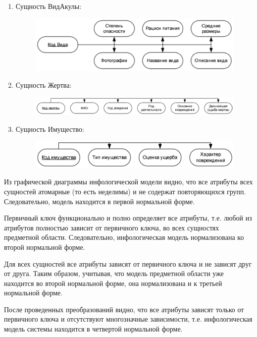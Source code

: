 \documentclass[russian,utf8,simple,emptystyle]{eskdtext}
\begin{document}
\begin{enumerate}
\begin{enumerate}
		\item Сущность ВидАкулы:
		\begin{figure}[h!]
		\centering
		\includegraphics*[width=\textwidth]{inf6}
		\end{figure}
		
		\item Сущность Жертва:
		\begin{figure}[h!]
		\centering
		\includegraphics*[width=\textwidth]{inf7}
		\end{figure}	
		\clearpage
		
		\item Сущность Имущество:
		\begin{figure}[h!]
		\centering
		\includegraphics*[width=\textwidth]{inf8}
		\end{figure}							
	\end{enumerate}
\end{enumerate}

Из графической диаграммы инфологической модели видно, что все атрибуты всех сущностей атомарные (то есть неделимы) и не содержат повторяющихся групп. Следовательно, модель находится в первой нормальной форме.

Первичный ключ функционально и полно определяет все атрибуты, т.е. любой из атрибутов полностью зависит от первичного ключа, во всех сущностях предметной области. Следовательно, инфологическая модель нормализована ко второй нормальной форме.

Для всех сущностей все атрибуты зависят от первичного ключа и не зависят друг от друга. Таким образом, учитывая, что модель предметной области уже находится во второй нормальной форме, она нормализована и к третьей нормальной форме.

После проведенных преобразований видно, что все атрибуты зависят только от первичного ключа и отсутствуют многозначные зависимости, т.е. инфологическая модель системы находится в четвертой нормальной форме.
\clearpage
\end{document}

